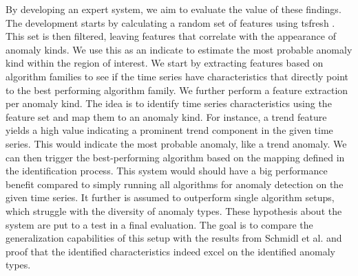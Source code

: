 By developing an expert system, we aim to evaluate the value of these findings. The development starts by calculating a random set of features using tsfresh \cite{tsfresh}. This set is then filtered, leaving features that correlate with the appearance of anomaly kinds. We use this as an indicate to estimate the most probable anomaly kind within the region of interest. 
We start by extracting features based on algorithm families to see if the time series have characteristics that directly point to the best performing algorithm family.
We further perform a feature extraction per anomaly kind. The idea is to identify time series characteristics using the feature set and map them to an anomaly kind. For instance, a trend feature yields a high value indicating a prominent trend component in the given time series. This would indicate the most probable anomaly, like a trend anomaly.
We can then trigger the best-performing algorithm based on the mapping defined in the identification process. This system would should have a big performance benefit compared to simply running all algorithms for anomaly detection on the given time series. It further is assumed to outperform single algorithm setups, which struggle with the diversity of anomaly types.
These hypothesis about the system are put to a test in a final evaluation. The goal is to compare the generalization capabilities of this setup with the results from Schmidl et al. and proof that the identified characteristics indeed excel on the identified anomaly types.
